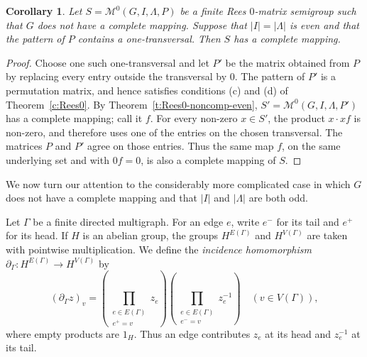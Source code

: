 \documentclass[11pt]{article}
\theoremstyle{plain}
\newtheorem{cor}[theorem]{Corollary}
\theoremstyle{remark}
\theoremstyle{definition}
\theoremstyle{plain}
\begin{document}
\begin{cor}\label{c:Rees0-even-transversal}
Let
\(S=\mathcal M^0(G,I,\Lambda,P)\)
be a finite Rees $0$-matrix semigroup such that $G$ does not have a complete
mapping. Suppose that $|I|=|\Lambda|$ is even and that the pattern of $P$
contains a one-transversal. Then $S$ has a complete mapping.
\end{cor}

\begin{proof}
Choose one such one-transversal and let $P'$ be the matrix obtained from $P$ by
replacing every entry outside the transversal by $0$. The pattern of $P'$ is a
permutation matrix, and hence satisfies conditions (c) and (d) of
Theorem~\ref{c:Rees0}. By Theorem~\ref{t:Rees0-noncomp-even},
\(S'=\mathcal M^0(G,I,\Lambda,P')\)
has a complete mapping; call it $f$. For every non-zero $x\in S'$, the product
$x\cdot xf$ is non-zero, and therefore uses one of the entries on the chosen
transversal. The matrices $P$ and $P'$ agree on those entries. Thus the same
map $f$, on the same underlying set and with $0f=0$, is also a complete mapping
of $S$.
\end{proof}

We now turn our attention to the considerably more complicated case in which $G$ does not have a complete mapping and that $|I|$ and $|\Lambda|$ are both odd.

Let $\Gamma$ be a finite directed multigraph. For an edge $e$, write $e^-$
for its tail and $e^+$ for its head. If $H$ is an abelian group, the groups
$H^{E(\Gamma)}$ and $H^{V(\Gamma)}$ are taken with pointwise multiplication.
We define the \emph{incidence homomorphism}
\(\partial_\Gamma\colon H^{E(\Gamma)}\longrightarrow H^{V(\Gamma)}\)
 by
\[
(\partial_\Gamma z)_v
        =
        \left(
        \prod_{\substack{e\in E(\Gamma)\\ e^+=v}}z_e
        \right)
        \left(
        \prod_{\substack{e\in E(\Gamma)\\ e^-=v}}z_e^{-1}
        \right)
        \quad (v\in V(\Gamma)),
\]
 where empty products are $1_H$. Thus an edge contributes $z_e$ at its head and
$z_e^{-1}$ at its tail.
\end{document}
